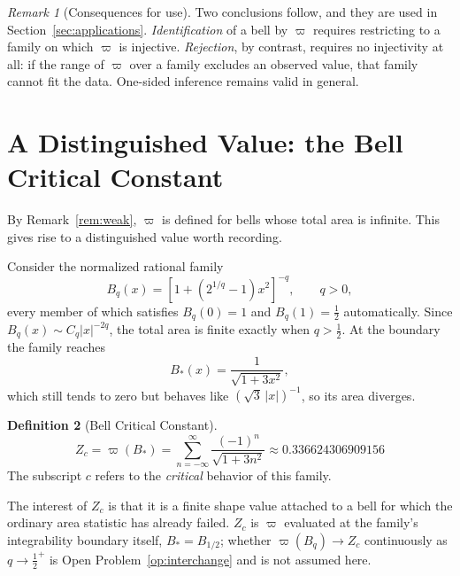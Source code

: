 \documentclass[11pt]{article}
\theoremstyle{definition}
\newtheorem{definition}{Definition}[section]
\theoremstyle{plain}
\theoremstyle{remark}
\newtheorem{remark}[definition]{Remark}
\begin{document}
\begin{remark}[Consequences for use]\label{rem:scope}
Two conclusions follow, and they are used in Section~\ref{sec:applications}.
\emph{Identification} of a bell by $\varpi$ requires restricting to a family on which
$\varpi$ is injective. \emph{Rejection}, by contrast, requires no injectivity at all: if
the range of $\varpi$ over a family excludes an observed value, that family cannot fit
the data. One-sided inference remains valid in general.
\end{remark}

 
\section{A Distinguished Value: the Bell Critical Constant}\label{sec:zc}
 

By Remark~\ref{rem:weak}, $\varpi$ is defined for bells whose total area is infinite.
This gives rise to a distinguished value worth recording.

Consider the normalized rational family
\[
B_q(x)=\left[1+\left(2^{1/q}-1\right)x^2\right]^{-q},\qquad q>0,
\]
every member of which satisfies $B_q(0)=1$ and $B_q(1)=\tfrac12$ automatically. Since
$B_q(x)\sim C_q|x|^{-2q}$, the total area is finite exactly when $q>\tfrac12$. At the
boundary the family reaches
\[
B_*(x)=\frac{1}{\sqrt{1+3x^2}},
\]
which still tends to zero but behaves like $(\sqrt3\,|x|)^{-1}$, so its area diverges.

\begin{definition}[Bell Critical Constant]\label{def:zc}
\[
\boxed{\;Z_c=\varpi(B_*)=\sum_{n=-\infty}^{\infty}\frac{(-1)^n}{\sqrt{1+3n^2}}
\approx 0.336624306909156\;}
\]
The subscript $c$ refers to the \emph{critical} behavior of this family.
\end{definition}

The interest of $Z_c$ is that it is a finite shape value attached to a bell for which the
ordinary area statistic has already failed. $Z_c$ is $\varpi$ evaluated at the family's
integrability boundary itself, $B_*=B_{1/2}$; whether $\varpi(B_q)\to Z_c$ continuously
as $q\to\tfrac12^+$ is Open Problem~\ref{op:interchange} and is not assumed here.
\end{document}
